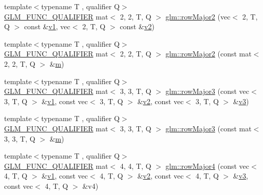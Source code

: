 \begin{DoxyCompactItemize}
\item 
{\footnotesize template$<$typename T , qualifier Q$>$ }\\\mbox{\hyperlink{setup_8hpp_a33fdea6f91c5f834105f7415e2a64407}{G\+L\+M\+\_\+\+F\+U\+N\+C\+\_\+\+Q\+U\+A\+L\+I\+F\+I\+ER}} mat$<$ 2, 2, T, Q $>$ \mbox{\hyperlink{group__gtx__matrix__major__storage_gaf5b1aee9e3eb1acf9d6c3c8be1e73bb8}{glm\+::row\+Major2}} (vec$<$ 2, T, Q $>$ const \&\mbox{\hyperlink{_s_d_l__opengl__glext_8h_a435c176a02c061b43e19bdf7c86cceae}{v1}}, vec$<$ 2, T, Q $>$ const \&\mbox{\hyperlink{_s_d_l__opengl__glext_8h_a0928f6d0f0f794ba000a21dfae422136}{v2}})
\item 
{\footnotesize template$<$typename T , qualifier Q$>$ }\\\mbox{\hyperlink{setup_8hpp_a33fdea6f91c5f834105f7415e2a64407}{G\+L\+M\+\_\+\+F\+U\+N\+C\+\_\+\+Q\+U\+A\+L\+I\+F\+I\+ER}} mat$<$ 2, 2, T, Q $>$ \mbox{\hyperlink{group__gtx__matrix__major__storage_gaf66c75ed69ca9e87462550708c2c6726}{glm\+::row\+Major2}} (const mat$<$ 2, 2, T, Q $>$ \&\mbox{\hyperlink{_s_d_l__opengl__glext_8h_af593500c283bf1a787a6f947f503a5c2}{m}})
\item 
{\footnotesize template$<$typename T , qualifier Q$>$ }\\\mbox{\hyperlink{setup_8hpp_a33fdea6f91c5f834105f7415e2a64407}{G\+L\+M\+\_\+\+F\+U\+N\+C\+\_\+\+Q\+U\+A\+L\+I\+F\+I\+ER}} mat$<$ 3, 3, T, Q $>$ \mbox{\hyperlink{group__gtx__matrix__major__storage_ga2ae46497493339f745754e40f438442e}{glm\+::row\+Major3}} (const vec$<$ 3, T, Q $>$ \&\mbox{\hyperlink{_s_d_l__opengl__glext_8h_a435c176a02c061b43e19bdf7c86cceae}{v1}}, const vec$<$ 3, T, Q $>$ \&\mbox{\hyperlink{_s_d_l__opengl__glext_8h_a0928f6d0f0f794ba000a21dfae422136}{v2}}, const vec$<$ 3, T, Q $>$ \&\mbox{\hyperlink{_s_d_l__opengl__glext_8h_acc806b31cbf466ceba6555983d8b814d}{v3}})
\item 
{\footnotesize template$<$typename T , qualifier Q$>$ }\\\mbox{\hyperlink{setup_8hpp_a33fdea6f91c5f834105f7415e2a64407}{G\+L\+M\+\_\+\+F\+U\+N\+C\+\_\+\+Q\+U\+A\+L\+I\+F\+I\+ER}} mat$<$ 3, 3, T, Q $>$ \mbox{\hyperlink{group__gtx__matrix__major__storage_gad8a3a50ab47bbe8d36cdb81d90dfcf77}{glm\+::row\+Major3}} (const mat$<$ 3, 3, T, Q $>$ \&\mbox{\hyperlink{_s_d_l__opengl__glext_8h_af593500c283bf1a787a6f947f503a5c2}{m}})
\item 
{\footnotesize template$<$typename T , qualifier Q$>$ }\\\mbox{\hyperlink{setup_8hpp_a33fdea6f91c5f834105f7415e2a64407}{G\+L\+M\+\_\+\+F\+U\+N\+C\+\_\+\+Q\+U\+A\+L\+I\+F\+I\+ER}} mat$<$ 4, 4, T, Q $>$ \mbox{\hyperlink{group__gtx__matrix__major__storage_ga9636cd6bbe2c32a8d0c03ffb8b1ef284}{glm\+::row\+Major4}} (const vec$<$ 4, T, Q $>$ \&\mbox{\hyperlink{_s_d_l__opengl__glext_8h_a435c176a02c061b43e19bdf7c86cceae}{v1}}, const vec$<$ 4, T, Q $>$ \&\mbox{\hyperlink{_s_d_l__opengl__glext_8h_a0928f6d0f0f794ba000a21dfae422136}{v2}}, const vec$<$ 4, T, Q $>$ \&\mbox{\hyperlink{_s_d_l__opengl__glext_8h_acc806b31cbf466ceba6555983d8b814d}{v3}}, const vec$<$ 4, T, Q $>$ \&v4)

\end{DoxyCompactItemize}
